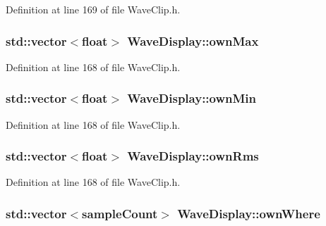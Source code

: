 Definition at line 169 of file Wave\+Clip.\+h.

\subsubsection[{\texorpdfstring{own\+Max}{ownMax}}]{\setlength{\rightskip}{0pt plus 5cm}std\+::vector$<$float$>$ Wave\+Display\+::own\+Max}\hypertarget{class_wave_display_aa7ff6cb0e0e89c973cb0878aabc134c1}{}\label{class_wave_display_aa7ff6cb0e0e89c973cb0878aabc134c1}


Definition at line 168 of file Wave\+Clip.\+h.

\subsubsection[{\texorpdfstring{own\+Min}{ownMin}}]{\setlength{\rightskip}{0pt plus 5cm}std\+::vector$<$float$>$ Wave\+Display\+::own\+Min}\hypertarget{class_wave_display_a0eaced19c319e8b0d37d8d20b96e6d00}{}\label{class_wave_display_a0eaced19c319e8b0d37d8d20b96e6d00}


Definition at line 168 of file Wave\+Clip.\+h.

\subsubsection[{\texorpdfstring{own\+Rms}{ownRms}}]{\setlength{\rightskip}{0pt plus 5cm}std\+::vector$<$float$>$ Wave\+Display\+::own\+Rms}\hypertarget{class_wave_display_af668dab41b38a1f1f4603783e4792caa}{}\label{class_wave_display_af668dab41b38a1f1f4603783e4792caa}


Definition at line 168 of file Wave\+Clip.\+h.

\subsubsection[{\texorpdfstring{own\+Where}{ownWhere}}]{\setlength{\rightskip}{0pt plus 5cm}std\+::vector$<${\bf sample\+Count}$>$ Wave\+Display\+::own\+Where}\hypertarget{class_wave_display_a931b7226e23c982bde54ddbdec6b38ec}{}\label{class_wave_display_a931b7226e23c982bde54ddbdec6b38ec}


